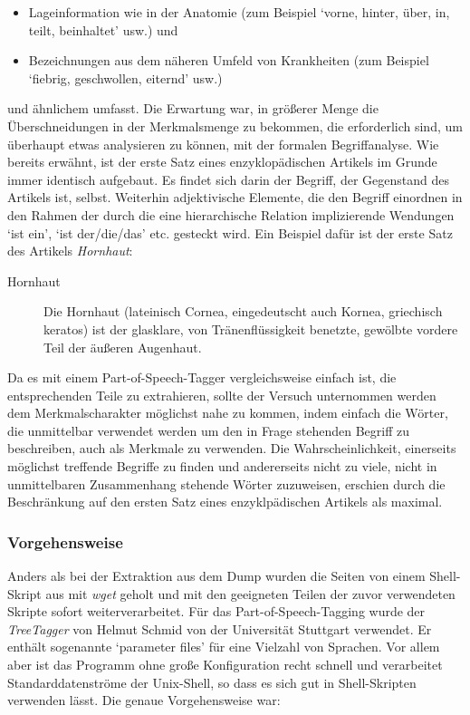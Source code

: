 \documentclass[pagesize,DIV=calc,12pt,draft]{scrreprt}
\begin{document}
\begin{itemize}
\item Lageinformation wie in der Anatomie (zum Beispiel `vorne, hinter, über, in, teilt, beinhaltet' usw.) und
\item Bezeichnungen aus dem näheren Umfeld von Krankheiten (zum Beispiel `fiebrig, geschwollen, eiternd' usw.)
\end{itemize}

und ähnlichem umfasst. 
Die Erwartung war, in größerer Menge die Überschneidungen in der Merkmalsmenge zu bekommen, die erforderlich sind, um überhaupt etwas analysieren zu können, mit der formalen Begriffanalyse. 
Wie bereits erwähnt, ist der erste Satz eines enzyklopädischen Artikels im Grunde immer identisch aufgebaut. 
Es findet sich darin der Begriff, der Gegenstand des Artikels ist, selbst. 
Weiterhin adjektivische Elemente, die den Begriff einordnen in den Rahmen der durch die eine hierarchische Relation implizierende Wendungen `ist ein', `ist der/die/das' etc. 
gesteckt wird. 
Ein Beispiel dafür ist der erste Satz des Artikels \emph{Hornhaut}: 

\begin{description}
\item[Hornhaut]
Die Hornhaut (lateinisch Cornea, eingedeutscht auch Kornea, griechisch keratos) ist der glasklare, von Tränenflüssigkeit benetzte, gewölbte vordere Teil der äußeren Augenhaut. 
\end{description}

Da es mit einem Part-of-Speech-Tagger vergleichsweise einfach ist, die entsprechenden Teile zu extrahieren, sollte der Versuch unternommen werden dem Merkmalscharakter möglichst nahe zu kommen, indem einfach die Wörter, die unmittelbar verwendet werden um den in Frage stehenden Begriff zu beschreiben, auch als Merkmale zu verwenden. 
Die Wahrscheinlichkeit, einerseits möglichst treffende Begriffe zu finden und andererseits nicht zu viele, nicht in unmittelbaren Zusammenhang stehende Wörter zuzuweisen, erschien durch die Beschränkung auf den ersten Satz eines enzyklpädischen Artikels als maximal. 

\subsubsection{Vorgehensweise}

Anders als bei der Extraktion aus dem Dump wurden die Seiten von einem Shell-Skript aus mit \emph{wget} geholt und mit den geeigneten Teilen der zuvor verwendeten Skripte sofort weiterverarbeitet. 
Für das Part-of-Speech-Tagging wurde der \emph{TreeTagger} von Helmut Schmid von der Universität Stuttgart verwendet. 
Er enthält sogenannte `parameter files' für eine Vielzahl von Sprachen. 
Vor allem aber ist das Programm ohne große Konfiguration recht schnell und verarbeitet Standarddatenströme der Unix-Shell, so dass es sich gut in Shell-Skripten verwenden lässt. 
Die genaue Vorgehensweise war: 
\end{document}
